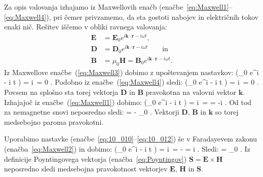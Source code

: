 Za opis valovanja izhajamo iz Maxwellovih enačb (enačbe~\ref{eq:Maxwell1}--\ref{eq:Maxwell4}), 
pri čemer privzamemo, da sta gostoti nabojev in električnih tokov enaki nič. 
Rešitev iščemo v obliki ravnega valovanja:
\begin{align}
 \mathbf{E} &= \mathbf{E}_0 e^{i\mathbf{k}\cdot \mathbf{r} - i \omega t}, \label{eq:10_010}\\
 \mathbf{D} &= \mathbf{D}_0 e^{i\mathbf{k}\cdot \mathbf{r} - i \omega t} \qquad \mathrm{in}\label{eq:10_011}\\
 \mathbf{B} &= \mu_0 \mathbf{H} = \mathbf{B}_0 e^{i\mathbf{k}\cdot \mathbf{r} - i \omega t}.
 \label{eq:10_012}
\end{align}
Iz Maxwellove enačbe~(\ref{eq:Maxwell3}) dobimo z upoštevanjem nastavkov:
\beq
\nabla \cdot \left(_0 e^{i\cdot {} - i \omega t} \right) = 
i\,\cdot {} = 0 \qquad \Longrightarrow \qquad {} \perp {}.
\label{eq:10_013}
\eeq
Podobno iz enačbe~(\ref{eq:Maxwell4}) sledi:
\beq
\nabla \cdot \left(_0 e^{i\cdot {} - i \omega t} \right) = 
i\,\cdot {} = 0 \qquad \Longrightarrow \qquad {} \perp {}.
\label{eq:10_014}
\eeq
Povsem na splošno sta torej vektorja $\mathbf{D}$ in $\mathbf{B}$ pravokotna na valovni vektor $\mathbf{k}$.
Izhajajoč iz enačbe~(\ref{eq:Maxwell1}) dobimo:
\beq
\nabla \times \left(_0 e^{i\cdot {} - i \omega t} \right) = 
i\,\times {} =  = -i \omega {}.
\label{eq:10_015}
\eeq
Od tod za nemagnetne snovi neposredno sledi:
\beq
{}\times {} = - \mu_0 \omega {} \qquad \Longrightarrow \qquad {} \perp {}.
\label{eq:10_016}
\eeq
Vektorji $\mathbf{D}$, $\mathbf{B}$ in $\mathbf{k}$ so torej medsebojno paroma pravokotni.

Uporabimo nastavke (enačbe~\ref{eq:10_010}--\ref{eq:10_012})
še v Faradayevem zakonu (enačba~\ref{eq:Maxwell2}) in dobimo:
\beq
\nabla \times \left(_0 e^{i\cdot {} - i \omega t} \right) = 
i\,\times {} = -  = i \omega {}.
\label{eq:10_017}
\eeq
Sledi:
\beq
{}\times {} = \omega \mu_0  \qquad \Longrightarrow 
\qquad {} \perp {}.
\label{eq:10_018}
\eeq
Iz definicije Poyntingovega vektorja (enačba~\ref{eq:Poyntingov}) 
$\mathbf{S} = \mathbf{E} \times \mathbf{H}$ neposredno sledi medsebojna 
pravokotnost vektorjev $\mathbf{E}$, $\mathbf{H}$ in $\mathbf{S}$.

